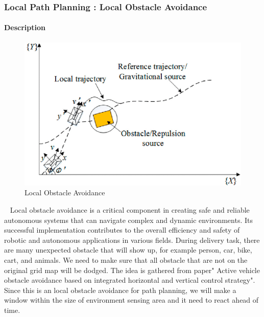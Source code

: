 \documentclass[12pt]{article}
\begin{document}
        \subsubsection{Local Path Planning : Local Obstacle Avoidance}
            \paragraph{Description}
                \begin{figure}[H]
                    \centering
                    \includegraphics[width=\textwidth,height=\textheight,keepaspectratio]{../local_obstacle.png}
                    \caption{Local Obstacle Avoidance}
                \end{figure}
                ~\newline
                Local obstacle avoidance is a critical component in creating safe and reliable autonomous systems that can navigate complex and dynamic environments. Its successful implementation contributes to the overall efficiency and safety of robotic and autonomous applications in various fields. During delivery task, there are many unexpected obstacle that will show up, for example person, car, bike, cart, and animals. We need to make sure that all obstacle that are not on the original grid map will be dodged. 
                The idea is gathered from \cite{article} paper" Active vehicle obstacle avoidance based on integrated horizontal and vertical control strategy".
                Since this is an local obstacle avoidance for path planning, we will make a window within the size of environment sensing area and it need to react ahead of time. \\
                
\end{document}
